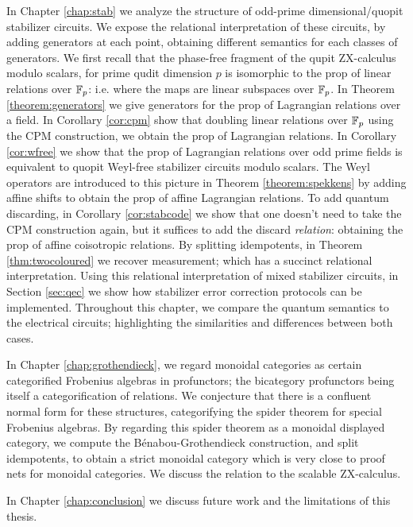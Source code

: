 In Chapter \ref{chap:stab}  we analyze the structure of odd-prime dimensional/quopit stabilizer circuits.
We expose the relational interpretation of these circuits, by adding generators at each point, obtaining different semantics for each classes of generators.  We first recall that the phase-free fragment of the qupit ZX-calculus modulo scalars, for prime qudit dimension $p$ is isomorphic to the prop of linear relations over $\mathbb{F}_p$: i.e. where the maps are linear subspaces over $\mathbb{F}_p$.
In Theorem \ref{theorem:generators} we give generators for the prop of Lagrangian relations over a field.
In Corollary \ref{cor:cpm} show that doubling  linear relations over $\mathbb{F}_p$ using the CPM construction, we obtain the prop of  Lagrangian relations. In Corollary \ref{cor:wfree} we  show that the prop of  Lagrangian relations over odd prime fields is equivalent to quopit Weyl-free stabilizer circuits modulo scalars. The Weyl operators are introduced to this picture in Theorem \ref{theorem:spekkens} by adding affine shifts to obtain the prop of affine Lagrangian relations. To add quantum discarding, in Corollary \ref{cor:stabcode} we show that one doesn't need to take the CPM construction again, but it suffices to add the discard {\em relation}:   obtaining the prop of affine coisotropic relations.  By splitting idempotents, in Theorem \ref{thm:twocoloured} we recover measurement; which has a succinct relational interpretation.  Using this relational interpretation of mixed stabilizer circuits, in Section \ref{sec:qec} we show how stabilizer error correction protocols can be implemented.  Throughout this chapter, we compare the quantum semantics to the electrical circuits; highlighting the similarities and differences between both cases.


In Chapter \ref{chap:grothendieck}, we regard monoidal categories as certain categorified Frobenius algebras in profunctors; the bicategory profunctors being itself a categorification of relations.  We conjecture that there is a confluent normal form for these structures, categorifying the spider theorem for special Frobenius algebras.  By regarding this spider theorem as a monoidal displayed category, we compute the B\'enabou-Grothendieck construction, and split idempotents, to obtain a strict monoidal category which is very close to proof nets for monoidal categories. We discuss the relation to the scalable ZX-calculus.

In Chapter \ref{chap:conclusion} we discuss future work and the limitations of this thesis.




